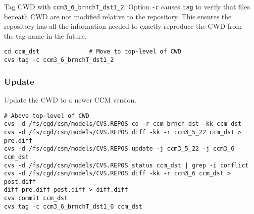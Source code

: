 \documentclass[12pt,twoside]{article}
\begin{document}
Tag CWD with \verb'ccm3_6_brnchT_dst1_2'. 
Option \verb'-c' causes \verb'tag' to verify that files beneath CWD
are not modified relative to the repository. 
This ensures the repository has all the information needed to exactly
reproduce the CWD from the tag name in the future.
\begin{verbatim}
cd ccm_dst              # Move to top-level of CWD
cvs tag -c ccm3_6_brnchT_dst1_2
\end{verbatim}

\subsubsection[Update]{Update}
Update the CWD to a newer CCM version.
\begin{verbatim}
# Above top-level of CWD
cvs -d /fs/cgd/csm/models/CVS.REPOS co -r ccm_brnch_dst -kk ccm_dst
cvs -d /fs/cgd/csm/models/CVS.REPOS diff -kk -r ccm3_5_22 ccm_dst > pre.diff
cvs -d /fs/cgd/csm/models/CVS.REPOS update -j ccm3_5_22 -j ccm3_6 ccm_dst
cvs -d /fs/cgd/csm/models/CVS.REPOS status ccm_dst | grep -i conflict
cvs -d /fs/cgd/csm/models/CVS.REPOS diff -kk -r ccm3_6 ccm_dst > post.diff
diff pre.diff post.diff > diff.diff
cvs commit ccm_dst
cvs tag -c ccm3_6_brnchT_dst1_0 ccm_dst
\end{verbatim}
\end{document}
